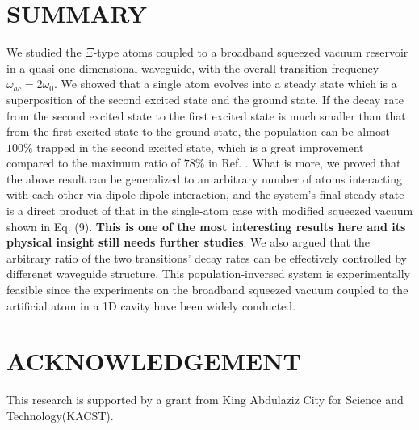 \documentclass[aps,showpacs,twocolumn,twoside,groupedaddress]{revtex4}
\begin{document}
\section{SUMMARY}
We studied the $\Xi$-type atoms coupled to a broadband squeezed vacuum reservoir in a quasi-one-dimensional waveguide, with the overall transition frequency $\omega_{ac}=2\omega_0$. We showed that a single atom evolves into a steady state which is a superposition of the second excited state and the ground state. If the decay rate from the second excited state to the first excited state is much smaller than that from the first excited state to the ground state, the population can be almost $100\%$ trapped in the second excited state, which is a great improvement compared to the maximum ratio of $78\%$ in Ref. \cite{ficek1993two}. What is more, we proved that the above result can be generalized to an arbitrary number of atoms interacting with each other via dipole-dipole interaction, and the system's final steady state is a direct product of that in the single-atom case with modified squeezed vacuum shown in Eq. (9).  \textbf{This is one of the most interesting results here and its physical insight still needs further studies}. We also argued that the arbitrary ratio  of the two transitions' decay rates can be effectively controlled by differenet waveguide structure. This population-inversed system is experimentally feasible since the experiments on the broadband squeezed vacuum coupled to the artificial atom in a 1D cavity have been widely conducted\cite{turchette1998qa, murch2013kw, toyli2016resonance, bergeal2010analog, wang2018cavity, qin2018exponentially}.



\section{ACKNOWLEDGEMENT}
This research is supported by a grant from King Abdulaziz City for Science and Technology(KACST).
\end{document}

